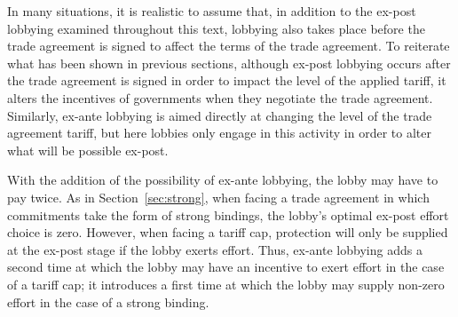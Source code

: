 

%
%




%

In many situations, it is realistic to assume that, in addition to the ex-post lobbying examined throughout this text, lobbying also takes place before the trade agreement is signed to affect the terms of the trade agreement. To reiterate what has been shown in previous sections, although ex-post lobbying occurs after the trade agreement is signed in order to impact the level of the applied tariff, it alters the incentives of governments when they negotiate the trade agreement. Similarly, ex-ante lobbying is aimed directly at changing the level of the trade agreement tariff, but here lobbies only engage in this activity in order to alter what will be possible ex-post.

With the addition of the possibility of ex-ante lobbying, the lobby may have to pay twice. As in Section~\ref{sec:strong}, when facing a trade agreement in which commitments take the form of strong bindings, the lobby's optimal ex-post effort choice is zero. However, when facing a tariff cap, protection will only be supplied at the ex-post stage if the lobby exerts effort. Thus, ex-ante lobbying adds a second time at which the lobby may have an incentive to exert effort in the case of a tariff cap; it introduces a first time at which the lobby may supply non-zero effort in the case of a strong binding.

